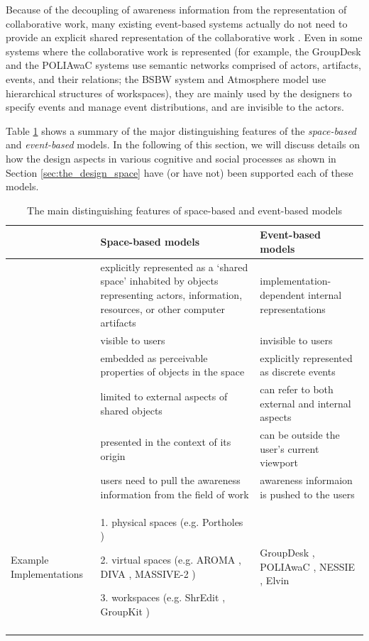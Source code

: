 Because of the decoupling of awareness information from the representation of collaborative work, many existing event-based systems actually do not need to provide an explicit shared representation of the collaborative work \cite{prinz1999a,Fitzpatrick2002}.  Even in some systems where the collaborative work is represented (for example, the GroupDesk \cite{Fuchs1995} and the POLIAwaC systems \cite{sohlenkamp2000po} use semantic networks comprised of actors, artifacts, events, and their relations; the BSBW system \cite{Bentley1995} and Atmosphere model \cite{Rittenbruch2002} use hierarchical structures of workspaces), they are mainly used by the designers to specify events and manage event distributions, and are invisible to the actors.

Table \ref{tab:awareness_models} shows a summary of the major distinguishing features of the \emph{space-based} and \emph{event-based} models. In the following of this section, we will discuss details on how the design aspects in various cognitive and social processes as shown in Section \ref{sec:the_design_space} have (or have not) been supported each of these models.

{\footnotesize
\begin{longtable}{>{\raggedright}p{1.1in}>{\raggedright}p{2.2in}>{\raggedright}p{2.2in}}
\toprule 
 & \textbf{Space-based models} & \textbf{Event-based models}\tabularnewline
\midrule 
\multirow{2}{1.1in}{Representation of the collaborative work} & explicitly represented as a `shared space' inhabited by objects representing
actors, information, resources, or other computer artifacts  & implementation-dependent internal representations\tabularnewline
\cmidrule{2-3} 
 & visible to users & invisible to users\tabularnewline
\midrule 
\multirow{4}{1.1in}{Awareness information} & embedded as perceivable properties of objects in the space & explicitly represented as discrete events\tabularnewline
\cmidrule{2-3} 
 & limited to external aspects of shared objects  & can refer to both external and internal aspects\tabularnewline
\cmidrule{2-3} 
 & presented in the context of its origin & can be outside the user's current viewport\tabularnewline
\cmidrule{2-3} 
 & users need to pull the awareness information from the field of work & awareness informaion is pushed to the users\tabularnewline
\midrule 
Example Implementations & 1. physical spaces (e.g. Portholes \cite{Dourish1992})

2. virtual spaces (e.g. AROMA \cite{Pedersen1997},
DIVA \cite{Berlage1999}, MASSIVE-2 \cite{Benford2001})

3. workspaces (e.g. ShrEdit \cite{dourish1992awareness},
GroupKit \cite{Roseman1996}) & GroupDesk \cite{Fuchs1995}, POLIAwaC \cite{sohlenkamp2000po},
NESSIE \cite{prinz1999a}, Elvin \cite{Fitzpatrick2002}\tabularnewline
\bottomrule

\caption{The main distinguishing features of space-based and event-based models}
\label{tab:awareness_models}
\end{longtable}
}

